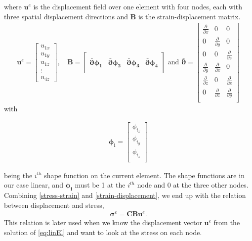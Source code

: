 where $\bm{u}^e$ is the displacement field over one element with four nodes, each with three spatial displacement directions and $\bm{B}$ is the strain-displacement matrix.
\begin{align*}
\bm{u}^e = 
\begin{bmatrix}
u_{1x} \\
u_{1y} \\
u_{1z} \\
\vdots \\
u_{4z}
\end{bmatrix}, \,
&\bm{B} = 
\begin{bmatrix} \\
\bar{\bm{\partial}} \bm{\phi_1} & \bar{\bm{\partial}} \bm{\phi_2} & \bar{\bm{\partial}} \bm{\phi_3} & \bar{\bm{\partial}} \bm{\phi_4} \\[1em]
\end{bmatrix} \textrm{ and } 
\bar{\bm{\partial}} = 
\begin{bmatrix}
\frac{\partial}{\partial x} & 0 & 0 \\[0.3em]
0 & \frac{\partial}{\partial y} & 0 \\[0.3em]
0 & 0 & \frac{\partial}{\partial z} \\[0.3em]
\frac{\partial}{\partial y} & \frac{\partial}{\partial x} & 0 \\[0.3em]
\frac{\partial}{\partial z} & 0 & \frac{\partial}{\partial x}\\[0.3em]
0 & \frac{\partial}{\partial z} & \frac{\partial}{\partial y} \\
\end{bmatrix}
\end{align*}
with 

\begin{align*}
\bm{\phi_i} = 
\begin{bmatrix}
\phi_{i_x} \\
\phi_{i_y} \\
\phi_{i_z} \\
\end{bmatrix}
\end{align*}

being the $i^{th}$ shape function on the current element. The shape functions are in our case linear, and $\bm{\phi_i}$ must be 1 at the $i^{th}$ node and 0 at the three other nodes. Combining \eqref{stress-strain} and \eqref{strain-displacement}, we end up with the relation between displacement and stress,
\begin{align}
\label{stress-displacement}
\bm{\sigma}^e = \bm{C} \bm{B} \bm{u}^e.
\end{align}
This relation is later used when we know the displacement vector $\bm{u}^e$ from the solution of \eqref{eq:linEl} and want to look at the stress on each node. 









